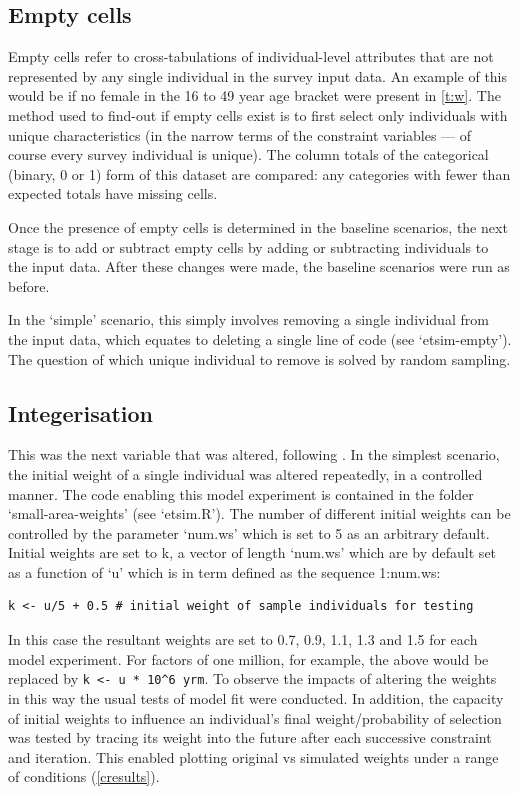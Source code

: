 \documentclass[a4paper,10pt]{article}
\begin{document}
\subsection{Empty cells} 
Empty cells refer to cross-tabulations of individual-level 
attributes that are not represented by any single individual 
in the survey input data. An example of this would be if no female 
in the 16 to 49 year age bracket were present in \cref{t:w}.
The method used to find-out if empty cells exist is to first 
select only individuals with unique characteristics 
(in the narrow terms of the constraint variables --- of course every survey individual is unique). 
The column totals of the categorical (binary, 0 or 1) form of this dataset are compared: 
any categories with fewer than expected totals have missing cells. 

Once the presence of empty cells is determined in the baseline scenarios, the next 
stage is to add or subtract empty cells by adding or subtracting individuals to the 
input data. After these changes were made, the baseline scenarios were run as before.

In the ‘simple’ scenario, this simply involves removing a single individual from the 
input data, which equates to deleting a single line of code (see `etsim-empty'). %
The question of which unique individual to remove is solved by random sampling. 

\subsection{Integerisation}
This was the next variable that was altered, 
following \citep{Lovelace2013-trs}. In the simplest scenario, the
initial weight of a single individual was altered 
repeatedly, in a controlled manner. The code enabling this model experiment 
is contained in the folder `small-area-weights' (see `etsim.R'). 
The number of different initial weights can be controlled by the 
parameter `num.ws' which is set to 5 as an arbitrary default.
Initial weights are set to k, a vector of length `num.ws' which
are by default set as a function of `u' which is in term
defined as the sequence 1:num.ws:

\begin{lstlisting}
k <- u/5 + 0.5 # initial weight of sample individuals for testing 
\end{lstlisting}

In this case the resultant weights are set to
 0.7, 0.9, 1.1, 1.3 and 1.5 for each model experiment. 
For factors of one million, for example, 
the above would be replaced by \lstinline !k <- u * 10^6 yrm!. 
To observe the impacts of altering the weights in this way
the usual tests of model fit were conducted. In addition,
the capacity of initial weights to influence an individual's 
final weight/probability of selection was tested by tracing its
weight into the future after each successive constraint and iteration. 
This enabled plotting original vs simulated weights under a 
range of conditions (\cref{cresults}).
  
\end{document}
